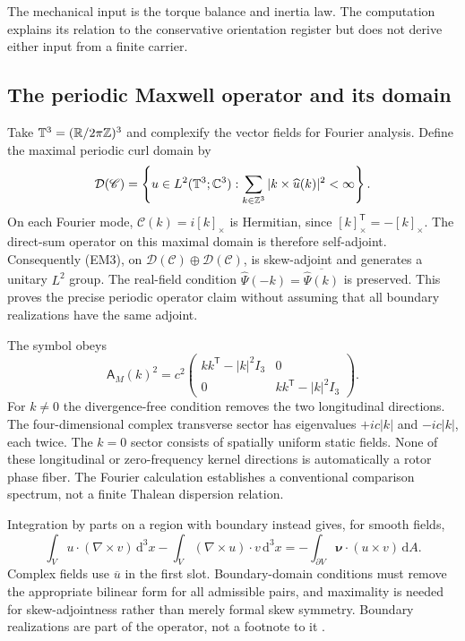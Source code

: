 The mechanical input is the torque balance and inertia law. The computation explains its relation to the conservative orientation register but does not derive either input from a finite carrier.

\subsection{The periodic Maxwell operator and its domain}
Take $\mathbb T^3=(\mathbb R/2\pi\mathbb Z)^3$ and complexify the vector fields for Fourier analysis. Define the maximal periodic curl domain by
\[
\mathcal D(\mathscr C)
=\left\{u\in L^2(\mathbb T^3;\mathbb C^3):
\sum_{k\in\mathbb Z^3}|k\times\widehat u(k)|^2<\infty\right\}.
\]
On each Fourier mode, $\mathscr C(k)=i[k]_\times$ is Hermitian, since $[k]_\times^{\mathsf T}=-[k]_\times$. The direct-sum operator on this maximal domain is therefore self-adjoint. Consequently (EM3), on $\mathcal D(\mathscr C)\oplus\mathcal D(\mathscr C)$, is skew-adjoint and generates a unitary $L^2$ group. The real-field condition $\widehat\Psi(-k)=\overline{\widehat\Psi(k)}$ is preserved. This proves the precise periodic operator claim without assuming that all boundary realizations have the same adjoint.

The symbol obeys
\begin{equation}
\mathsf A_M(k)^2=c^2
\begin{pmatrix}
kk^{\mathsf T}-|k|^2I_3&0\\
0&kk^{\mathsf T}-|k|^2I_3
\end{pmatrix}.
\tag{EM7}\label{eq:maxwellsymbol}
\end{equation}
For $k\ne0$ the divergence-free condition removes the two longitudinal directions. The four-dimensional complex transverse sector has eigenvalues $+ic|k|$ and $-ic|k|$, each twice. The $k=0$ sector consists of spatially uniform static fields. None of these longitudinal or zero-frequency kernel directions is automatically a rotor phase fiber. The Fourier calculation establishes a conventional comparison spectrum, not a finite Thalean dispersion relation.

Integration by parts on a region with boundary instead gives, for smooth fields,
\[
\int_V u\cdot(\nabla\times v)\,\mathrm d^3x
-\int_V(\nabla\times u)\cdot v\,\mathrm d^3x
=-\int_{\partial V}\boldsymbol\nu\cdot(u\times v)\,\mathrm dA.
\]
Complex fields use $\overline u$ in the first slot. Boundary-domain conditions must remove the appropriate bilinear form for all admissible pairs, and maximality is needed for skew-adjointness rather than merely formal skew symmetry. Boundary realizations are part of the operator, not a footnote to it \citep{ellerkarabash2021}.

